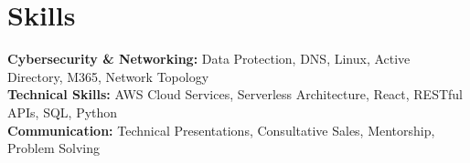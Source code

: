 \documentclass[11pt]{article}       %
\begin{document}
\vspace{-18.5pt}

\section*{Skills}
\textbf{Cybersecurity \& Networking:} Data Protection, DNS, Linux, Active Directory, M365, Network Topology\\
\textbf{Technical Skills:} AWS Cloud Services, Serverless Architecture, React, RESTful APIs, SQL, Python\\
\textbf{Communication:} Technical Presentations, Consultative Sales, Mentorship, Problem Solving\\

\vspace{-6.5pt}
\end{document}
